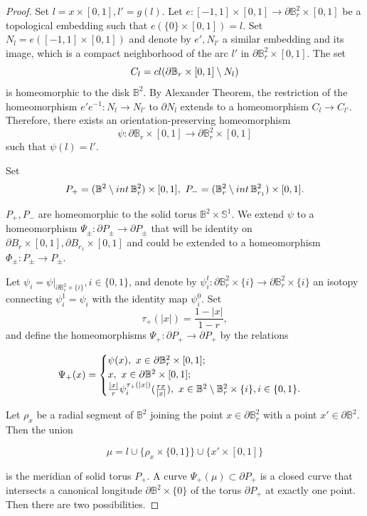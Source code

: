 \documentclass[10pt,a4paper]{amsart}
\begin{document}
\begin{proof} Set $l=x\times [0,1], l'=g(l)$. Let $e:[-1,1]\times [0,1]\to \partial \mathbb B^2_r\times [0,1]$ be a topological embedding such that $e(\{0\}\times [0,1])=l$. Set $N_l=e([-1,1]\times [0,1])$ and denote by $e', N_{l'}$ a similar embedding and its image, which is a compact neighborhood of the arc $l'$ in $\partial \mathbb B^2_r\times [0,1]$.
The set $$C_l={\rm cl} (\partial \mathbb B_r\times [0,1]\setminus N_l)$$ is homeomorphic to the disk $\mathbb B^2$. By Alexander Theorem, the restriction of the homeomorphism $e'e^{-1}: N_l\to N_{l'}$ to $\partial N_l$ extends to a homeomorphism $C_l\to C_{l'}$. Therefore, there exists an orientation-preserving homeomorphism
$$\psi: \partial \mathbb B_r\times [0,1]\to \partial \mathbb B^2_r\times [0,1]$$
such that $\psi(l)=l'$. 

Set $$P_+=(\mathbb B^2\setminus {\rm int}\, \mathbb B^2_{r}) \times [0,1],\  P_-=(\mathbb B^2_{r}\setminus {\rm int}\, \mathbb B^2_{r_1}) \times [0,1].$$

 $P_+, P_-$ are homeomorphic to the solid torus   $\mathbb B^2\times \mathbb S^1$. We extend $\psi$ to a homeomorphism $\Psi_\pm:\partial P_\pm\to \partial P_\pm$ that will be identity on $\partial B_r\times [0,1], \partial B_{r_1}\times [0,1]$ and could be extended to a homeomorphism $\Phi_\pm: P_\pm\to P_\pm$. 

Let $\psi_{i}=\psi|_{\partial \mathbb B^2_r\times \{i\}}, i\in \{0,1\}$, and denote by $\psi^t_i: \partial \mathbb B^2_r\times \{i\}\to \partial \mathbb B^2_r\times \{i\}$ an isotopy connecting $\psi^1_i=\psi_i$ with the identity map $\psi^0_i$.  Set $$\tau_+(|x|)=\frac{1-|x|}{1-r},$$ and  define the   homeomorphisms $\Psi_+: \partial P_+\to \partial P_+$ by the relations

$$
\Psi_+(x)=\begin{cases}\psi(x),\ x\in \partial \mathbb B^2_r\times [0,1];\cr
x,\ x\in \partial \mathbb B^2\times [0,1];\cr
\frac{|x|}{r} \psi^{\tau_+(|x|)}_i(\frac{rx}{|x|}),\ x\in \mathbb B^2\setminus \mathbb B^2_r\times \{i\}, i\in \{0,1\}.
\end{cases}
$$

Let  $\rho_{x}$  be a radial  segment of   $\mathbb B^2$ joining the point $x\in \partial \mathbb B^2_r$ with a point  $x'\in \partial \mathbb B^2$. Then the union 

$$\mu=l\cup \{\rho_x\times \{0,1\}\}\cup \{x'\times [0,1]\}$$

is the meridian of solid torus $P_+$. A curve $\Psi_+(\mu)\subset \partial P_+$ is a closed curve that intersects a canonical longitude $\partial \mathbb B^2\times \{0\}$ of the torus $\partial P_+$ at exactly one point. Then there  are two possibilities. 


\end{proof}
\end{document}
